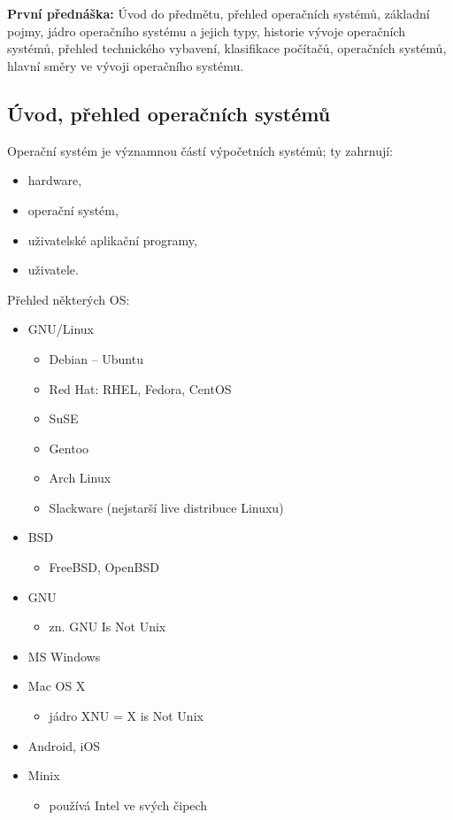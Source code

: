 \documentclass[a4paper, 11pt]{article}
\begin{document}
\newpage

\section{} \label{start-of-doc}
\textbf{První přednáška:} Úvod do předmětu, přehled operačních systémů, základní pojmy, jádro operačního systému a jejich typy, historie vývoje operačních systémů, přehled technického vybavení, klasifikace počítačů, operačních systémů, hlavní směry ve vývoji operačního systému.

\subsection{Úvod, přehled operačních systémů}
Operační systém je významnou částí výpočetních systémů; ty zahrnují:
\begin{itemize}
    \item hardware, 
    \item operační systém,
    \item uživatelské aplikační programy,
    \item uživatele.
\end{itemize}

Přehled některých OS:
\begin{itemize}
    \item GNU/Linux 
    \begin{itemize}
        \item Debian -- Ubuntu 
        \item Red Hat: RHEL, Fedora, CentOS 
        \item SuSE 
        \item Gentoo
        \item Arch Linux
        \item Slackware (nejstarší live distribuce Linuxu)
    \end{itemize}
    \item BSD 
    \begin{itemize}
        \item FreeBSD, OpenBSD 
    \end{itemize}
    \item GNU
    \begin{itemize}
        \item zn. GNU Is Not Unix
    \end{itemize}
    \item MS Windows 
    \item Mac OS X
    \begin{itemize}
        \item jádro XNU = X is Not Unix
    \end{itemize}
    \item Android, iOS
    \item Minix
    \begin{itemize}
        \item používá Intel ve svých čipech
    \end{itemize}
\end{itemize}
\newpage
\end{document}
